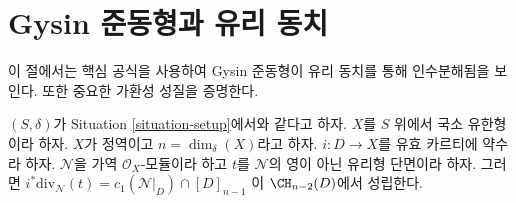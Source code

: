 \section{Gysin 준동형과 유리 동치}
\label{section-gysin}

\noindent
이 절에서는 핵심 공식을 사용하여 Gysin 준동형이 유리 동치를 통해
인수분해됨을 보인다. 또한 중요한 가환성 성질을 증명한다.

\begin{lemma}
\label{lemma-gysin-factors-general}
$(S, \delta)$가 Situation \ref{situation-setup}에서와 같다고 하자.
$X$를 $S$ 위에서 국소 유한형이라 하자.
$X$가 정역이고 $n = \dim_\delta(X)$라고 하자.
$i : D \to X$를 유효 카르티에 약수라 하자.
$\mathcal{N}$을 가역 $\mathcal{O}_X$-모듈이라 하고
$t$를 $\mathcal{N}$의 영이 아닌 유리형 단면이라 하자.
그러면 $i^*\text{div}_\mathcal{N}(t) = c_1(\mathcal{N}|_D) \cap [D]_{n - 1}$
이 $\CH_{n - 2}(D)$에서 성립한다.
\end{lemma}

